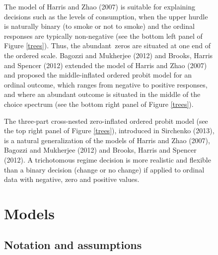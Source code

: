 \documentclass[letterpaper,fleqn,12pt]{article}
\begin{document}
\begin{figure}[H]
\begin{onehalfspace}
The model of Harris and Zhao (2007) is suitable for explaining decisions
such as the levels of consumption, when the upper hurdle is naturally binary
(to smoke or not to smoke) and the ordinal responses are typically
non-negative (see the bottom left panel of Figure \ref{trees}). Thus, the
abundant\ zeros are situated at one end of the ordered scale. Bagozzi and
Mukherjee (2012) and Brooks, Harris and Spencer (2012) extended the model of
Harris and Zhao (2007) and proposed the middle-inflated ordered probit model
for an ordinal outcome, which ranges from negative to positive responses,
and where an abundant outcome is situated in the middle of the choice
spectrum (see the bottom right panel of Figure \ref{trees}).

The three-part cross-nested zero-inflated ordered probit model (see the top
right panel of Figure \ref{trees}), introduced in Sirchenko (2013), is a
natural generalization of the models of Harris and Zhao (2007), Bagozzi and
Mukherjee (2012) and Brooks, Harris and Spencer (2012). A trichotomous
regime decision is more realistic and flexible than a binary decision
(change or no change) if applied to ordinal data with negative, zero and
positive values.

\section{\noindent Models}

\subsection{Notation and assumptions}


\end{onehalfspace}
\end{figure}
\end{document}
